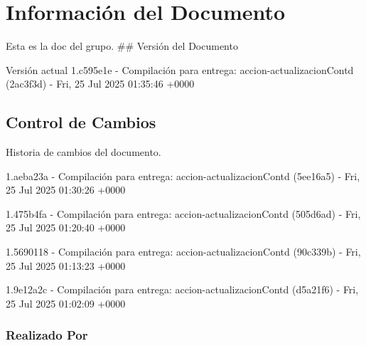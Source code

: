 \documentclass[
	a4paper, %
	12pt, %
]{include/CSSullivanBusinessReport}
\begin{document}
\newpage

\begin{twothirdswidth} %
	\tableofcontents %
\end{twothirdswidth}

\newpage


\newpage

\section{Información del
Documento}\label{sec:informaciuxf3n-del-documento}

Esta es la doc del grupo. \#\# Versión del Documento

\begin{quote}
\end{quote}

Versión actual 1.c595e1e - Compilación para entrega:
accion-actualizacionContd (2ac3f3d) - Fri, 25 Jul 2025 01:35:46 +0000

\subsection{Control de Cambios}\label{sec:control-de-cambios}

Historia de cambios del documento.

1.aeba23a - Compilación para entrega: accion-actualizacionContd
(5ee16a5) - Fri, 25 Jul 2025 01:30:26 +0000

1.475b4fa - Compilación para entrega: accion-actualizacionContd
(505d6ad) - Fri, 25 Jul 2025 01:20:40 +0000

1.5690118 - Compilación para entrega: accion-actualizacionContd
(90c339b) - Fri, 25 Jul 2025 01:13:23 +0000

1.9e12a2c - Compilación para entrega: accion-actualizacionContd
(d5a21f6) - Fri, 25 Jul 2025 01:02:09 +0000

\subsubsection{Realizado Por}\label{sec:realizado-por}
\end{document}
